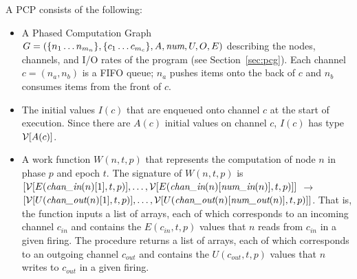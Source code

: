 \newpage
\noindent A PCP consists of the following:
\begin{itemize}

\item A Phased Computation Graph $G = (\{n_1 \dots n_{m_n}\}, \{c_1
\dots c_{m_c}\}, A, \mbox{\it num}, U, O, E)$ describing the nodes,
channels, and I/O rates of the program (see Section~\ref{sec:pcg}).
Each channel $c = (n_a, n_b)$ is a FIFO queue; $n_a$ pushes items onto
the back of $c$ and $n_b$ consumes items from the front of $c$.

\item The initial values $I(c)$ that are enqueued onto channel $c$ at
the start of execution.  Since there are $A(c)$ initial values on
channel $c$, $I(c)$ has type ${\cal V}[A(c)]$.

%
\item A work function $W(n, t, p)$ that represents the computation of
node $n$ in phase $p$ and epoch $t$.  The signature of $W(n, t, p)$ is
$[{\cal V}[E(\mbox{\it chan\_in}(n)[1], t, p)], \dots, {\cal
V}[E(\mbox{\it chan\_in}(n)[\mbox{\it num\_in}(n)], t, p)]]$ $\rightarrow$ \\ $[
{\cal V}[U(\mbox{\it chan\_out}(n)[1], t, p)], \dots, {\cal
V}[U(\mbox{\it chan\_out}(n)[\mbox{\it num\_out}(n)], t, p)]]$.  That is, the
function inputs a list of arrays, each of which corresponds to an
incoming channel $c_{in}$ and contains the $E(c_{in},t,p)$ values that
$n$ reads from $c_{in}$ in a given firing.  The procedure returns a
list of arrays, each of which corresponds to an outgoing channel
$c_{out}$ and contains the $U(c_{out},t,p)$ values that $n$ writes to
$c_{out}$ in a given firing.

\end{itemize}


